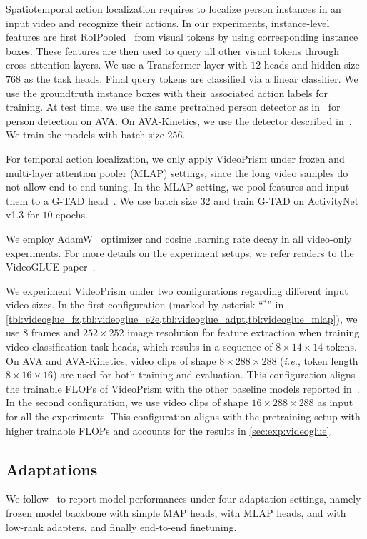 \documentclass{article}
\theoremstyle{plain}
\theoremstyle{definition}
\theoremstyle{remark}
\newcommand{\OURS}{VideoPrism\xspace}
\newcommand{\ie}{\textit{i.e.}\xspace}
\begin{document}
Spatiotemporal action localization requires to localize person instances in an input video and recognize their actions.
In our experiments, instance-level features are first RoIPooled~\cite{ren2015fasterrcnn} from visual tokens by using corresponding instance boxes. 
These features are then used to query all other visual tokens through cross-attention layers.
We use a Transformer layer with $12$ heads and hidden size $768$ as the task heads.
Final query tokens are classified via a linear classifier.
We use the groundtruth instance boxes with their associated action labels for training.
At test time, we use the same pretrained person detector as in~\citet{feichtenhofer2018slowfast} for person detection on AVA. 
On AVA-Kinetics, we use the detector described in~\citet{li2020ava}. 
We train the models with batch size $256$.

For temporal action localization, we only apply \OURS under frozen and multi-layer attention pooler (MLAP) settings, since the long video samples do not allow end-to-end tuning.
In the MLAP setting, we pool features and input them to a G-TAD head~\cite{xu2019gtad}.
We use batch size $32$ and train G-TAD on ActivityNet v1.3 for $10$ epochs.

We employ AdamW~\cite{loshchilov2017adamw} optimizer and cosine learning rate decay in all video-only experiments. 
For more details on the experiment setups, we refer readers to the VideoGLUE paper~\cite{yuan2023videoglue}.

We experiment \OURS under two configurations regarding different input video sizes. In the first configuration (marked by asterisk ``$^{\ast}$'' in \cref{tbl:videoglue_fz,tbl:videoglue_e2e,tbl:videoglue_adpt,tbl:videoglue_mlap}), we use $8$ frames and $252\times252$ image resolution for feature extraction when training video classification task heads, which results in a sequence of $8\times14\times14$ tokens. On AVA and AVA-Kinetics, video clips of shape $8\times288\times288$ (\ie, token length $8\times16\times16$) are used for both training and evaluation. This configuration aligns the trainable FLOPs of \OURS with the other baseline models reported in~\citet{yuan2023videoglue}. In the second configuration, we use video clips of shape $16\times288\times288$ as input for all the experiments. This configuration aligns with the pretraining setup with higher trainable FLOPs and accounts for the results in \cref{sec:exp:videoglue}.

\subsection{Adaptations}
We follow~\citet{yuan2023videoglue} to report model performances under four adaptation settings, namely frozen model backbone with simple MAP heads, with MLAP heads, and with low-rank adapters, and finally end-to-end finetuning. 
\end{document}
